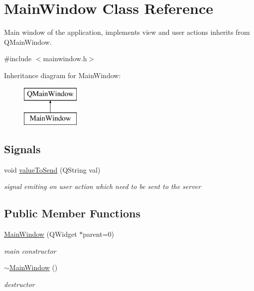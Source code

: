 \hypertarget{class_main_window}{\section{Main\-Window Class Reference}
\label{class_main_window}
}


Main window of the application, implements view and user actions inherits from Q\-Main\-Window.  




{\ttfamily \#include $<$mainwindow.\-h$>$}

Inheritance diagram for Main\-Window\-:\begin{figure}[H]
\begin{center}
\leavevmode
\includegraphics[height=2.000000cm]{class_main_window}
\end{center}
\end{figure}
\subsection*{Signals}
\begin{DoxyCompactItemize}
\item 
void \hyperlink{class_main_window_ad51fc5f7e60f54755507a04190f94891}{value\-To\-Send} (Q\-String val)
\begin{DoxyCompactList}\small\item\em signal emiting on user action which need to be sent to the server \end{DoxyCompactList}\end{DoxyCompactItemize}
\subsection*{Public Member Functions}
\begin{DoxyCompactItemize}
\item 
\hyperlink{class_main_window_a8b244be8b7b7db1b08de2a2acb9409db}{Main\-Window} (Q\-Widget $\ast$parent=0)
\begin{DoxyCompactList}\small\item\em main constructor \end{DoxyCompactList}\item 
\hypertarget{class_main_window_ae98d00a93bc118200eeef9f9bba1dba7}{\hyperlink{class_main_window_ae98d00a93bc118200eeef9f9bba1dba7}{$\sim$\-Main\-Window} ()}\label{class_main_window_ae98d00a93bc118200eeef9f9bba1dba7}

\begin{DoxyCompactList}\small\item\em destructor \end{DoxyCompactList}\end{DoxyCompactItemize}
